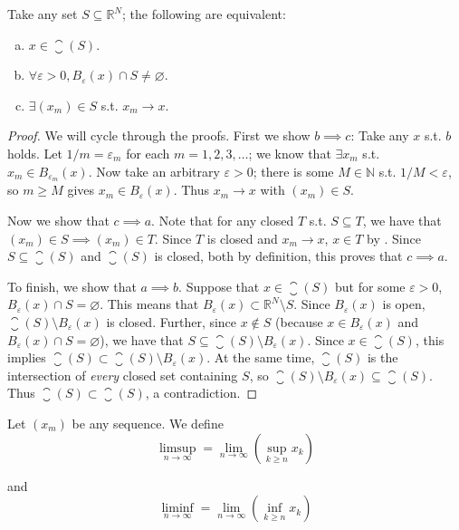 \documentclass{article}
\begin{document}
\begin{theorem}
  Take any set $S \subseteq \mathbb{R}^N$; the following are equivalent:
  \begin{enumerate}[a)]
    \item $x \in \closure(S)$.
    \item $\forall \varepsilon > 0, B_{\varepsilon}(x) \cap S \ne \varnothing$.
    \item $\exists (x_m) \in S$ s.t. $x_m \to x$.
  \end{enumerate}
\end{theorem}

\begin{proof}
  We will cycle through the proofs. First we show $b \implies c$: Take any $x$ s.t. $b$ holds. Let $1/m = \varepsilon_m$ for each $m = 1, 2, 3, \ldots$; we know that $\exists x_m$ s.t. $x_m \in B_{\varepsilon_m}(x)$. Now take an arbitrary $\varepsilon > 0$; there is some $M \in \mathbb{N}$ s.t. $1 / M < \varepsilon$, so $m \ge M$ gives $x_m \in B_{\varepsilon}(x)$. Thus $x_m \to x$ with $(x_m) \in S$.

  Now we show that $c \implies a$. Note that for any closed $T$ s.t. $S \subseteq T$, we have that $(x_m) \in S \implies (x_m) \in T$. Since $T$ is closed and $x_m \to x$, $x \in T$ by . Since $S \subseteq \closure(S)$ and $\closure(S)$ is closed, both by definition, this proves that $c \implies a$.

  To finish, we show that $a \implies b$. Suppose that $x \in \closure(S)$ but for some $\varepsilon > 0$, $B_{\varepsilon}(x) \cap S = \varnothing$. This means that $B_{\varepsilon}(x) \subset \mathbb{R}^N \setminus S$. Since $B_{\varepsilon}(x)$ is open, $\closure(S) \setminus B_{\varepsilon}(x)$ is closed. Further, since $x \notin S$ (because $x \in B_{\varepsilon}(x)$ and $B_{\varepsilon}(x) \cap S = \varnothing$), we have that $S \subseteq \closure(S) \setminus B_{\varepsilon}(x)$.  Since $x \in \closure(S)$, this implies $\closure(S) \subset \closure(S) \setminus B_{\varepsilon}(x)$. At the same time, $\closure(S)$ is the intersection of \textit{every} closed set containing $S$, so $\closure(S) \setminus B_{\varepsilon}(x) \subseteq \closure(S)$. Thus $\closure(S) \subset \closure(S)$, a contradiction.
\end{proof}

\begin{definition}
  Let $(x_m)$ be any sequence. We define
  \[
    \limsup_{n \to \infty} = \lim_{n \to \infty} \left(\sup_{k \ge n} x_k\right)
  \]

  and
  \[
    \liminf_{n \to \infty} = \lim_{n \to \infty} \left(\inf_{k \ge n} x_k\right)
  \]
\end{definition}
\end{document}
